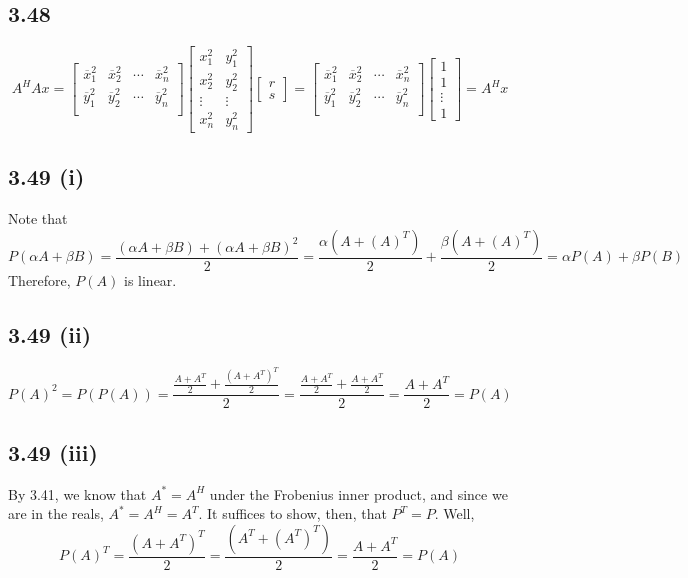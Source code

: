 \documentclass[letterpaper,12pt]{article}
\theoremstyle{definition}
\begin{document}
\subsection*{3.48}
\[A^HAx = 
\begin{bmatrix}
    \overline x_1^2 & \overline x_2^2 & \cdots & \overline x_n^2 \\ 
    \overline y_1^2 & \overline y_2^2 & \cdots & \overline y_n^2 \\ 
\end{bmatrix}
\begin{bmatrix}
    x_1^2 & y_1^2 \\ 
    x_2^2 & y_2^2 \\ 
    \vdots &\vdots\\
    x_n^2 & y_n^2
\end{bmatrix}
\begin{bmatrix}
    r\\s
\end{bmatrix}
=
\begin{bmatrix}
    \overline x_1^2 & \overline x_2^2 & \cdots & \overline x_n^2 \\ 
    \overline y_1^2 & \overline y_2^2 & \cdots & \overline y_n^2 \\ 
\end{bmatrix}
\begin{bmatrix}
    1\\1\\\vdots\\1
\end{bmatrix}
 = A^Hx
\]
\subsection*{3.49 (i)}
Note that 
\[P(\alpha A  + \beta B) =\frac{\left( \alpha A  + \beta B \right) + \left( \alpha A  + \beta B \right)^2 }{2} = \frac{\alpha (A + (A)^T)}{2} + \frac{\beta (A + (A)^T)}{2} = \alpha P(A) + \beta P(B)  \]
Therefore, $P(A)$ is linear.

\subsection*{3.49 (ii)}
 \[P(A)^{2}=P(P(A))=\frac{\frac{A+A^{T}}{2}+\frac{(A+A^{T})^{T}}{2}}{2} 
=\frac{\frac{A+A^{T}}{2}+\frac{A+A^{T}}{2}}{2}=\frac{A+A^{T}}{2}=P(A) \] 

\subsection*{3.49 (iii)}
By 3.41, we know that $A^* = A^H$ under the Frobenius inner product, and since we are in the reals, $A^* = A^H = A^T$. It suffices to show, then, that $P^T = P$. Well,
\[P(A)^{T} = \frac{(A+A^{T})^{T} } {2 } = \frac{(A^{T}+(A^{T})^{T}) } {2 } = \frac{A+A^{T}}{2} = P(A) \] 
\end{document}

